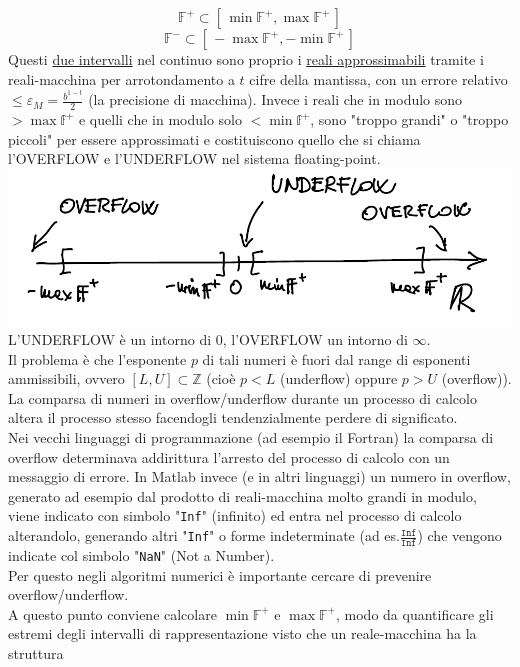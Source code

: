 \documentclass[12pt]{article}
\begin{document}
\[ \mathbb{F}^+ \subset [\,\min \mathbb{F}^+, \max \mathbb{F}^+\,] \]
\[ \mathbb{F}^- \subset [\,- \max \mathbb{F}^+, - \min \mathbb{F}^+\,] \]
Questi \underline{due intervalli} nel continuo sono proprio i \underline{reali approssimabili} tramite i reali-macchina per arrotondamento a $t$ cifre della mantissa, con un errore relativo $\le \varepsilon_M = \frac{b^{1-t}}{2}$ (la precisione di macchina). Invece i reali che in modulo sono $> \max \mathbb{f}^+$ e quelli che in modulo solo $< \min \mathbb{f}^+$, sono "troppo grandi" o "troppo piccoli" per essere approssimati e costituiscono quello che si chiama l'OVERFLOW e l'UNDERFLOW nel sistema floating-point.\newline
\includegraphics[width=\linewidth]{img3}
L'UNDERFLOW è un intorno di 0, l'OVERFLOW un intorno di $\infty$.\\
Il problema è che l'esponente $p$ di tali numeri è fuori dal range di esponenti ammissibili, ovvero $[L,U] \subset \mathbb{Z}$ (cioè $p < L$ (underflow) oppure $p > U$ (overflow)).\\
La comparsa di numeri in overflow/underflow durante un processo di calcolo altera il processo stesso facendogli tendenzialmente perdere di significato. \\
Nei vecchi linguaggi di programmazione (ad esempio il Fortran) la comparsa di overflow determinava addirittura l'arresto del processo di calcolo con un messaggio di errore. In Matlab invece (e in altri linguaggi) un numero in overflow, generato ad esempio dal prodotto di reali-macchina molto grandi in modulo, viene indicato con simbolo "\texttt{Inf}" (infinito) ed entra nel processo di calcolo alterandolo, generando altri "\texttt{Inf}" o forme indeterminate (ad es.$\frac{\texttt{Inf}}{\texttt{Inf}}$) che vengono indicate col simbolo "\texttt{NaN}" (Not a Number).\\
Per questo negli algoritmi numerici è importante cercare di prevenire overflow/underflow. \\
A questo punto conviene calcolare $\min \mathbb{F}^+$ e $\max \mathbb{F}^+$, modo da quantificare gli estremi degli intervalli di rappresentazione visto che un reale-macchina ha la struttura 
\end{document}
